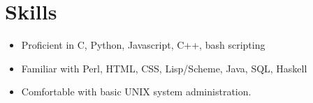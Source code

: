 \documentclass[letterpaper,10pt]{article}
\begin{document}
\section*{Skills}
\vspace*{-0.2cm}
\begin{itemize}
\item Proficient in C, Python, Javascript, C++, bash scripting
\item Familiar with Perl, HTML, CSS, Lisp/Scheme, Java, SQL, Haskell
\item Comfortable with basic UNIX system administration.

\end{itemize}

\end{document}

